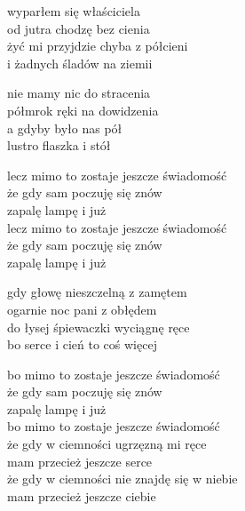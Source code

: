 \begin{textn}
    \ifchorded{\hfill\break}
    wyparłem się właściciela\\
    od jutra chodzę bez cienia\\
    żyć mi przyjdzie chyba z półcieni\\
    i żadnych śladów na ziemii

    nie mamy nic do stracenia\\
    półmrok ręki na dowidzenia\\
    a gdyby było nas pół\\
    lustro flaszka i stół

    \vin lecz mimo to zostaje jeszcze świadomość\\
    \vin że gdy sam poczuję się znów\\
    \vin zapalę lampę i już\\
    \vin lecz mimo to zostaje jeszcze świadomość\\
    \vin że gdy sam poczuję się znów\\
    \vin zapalę lampę i już

    gdy głowę nieszczelną z zamętem\\
    ogarnie noc pani z obłędem\\
    do łysej śpiewaczki wyciągnę ręce\\
    bo serce i cień to coś więcej

    \vin bo mimo to zostaje jeszcze świadomość\\
    \vin że gdy sam poczuję się znów\\
    \vin zapalę lampę i już\\
    \vin bo mimo to zostaje jeszcze świadomość\\
    \vin że gdy w ciemności ugrzęzną mi ręce\\
    \vin mam przecież jeszcze serce\\
    \vin że gdy w ciemności nie znajdę się w niebie\\
    \vin mam przecież jeszcze ciebie
\end{textn}
